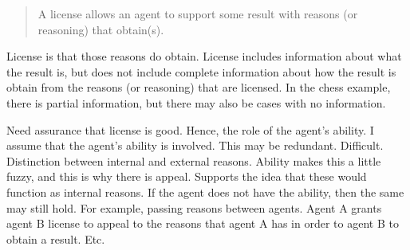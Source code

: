 \documentclass[10pt]{article}
\begin{document}
\begin{note}[License]

  \begin{quote}
    A license allows an agent to support some result with reasons (or reasoning) that obtain(s).
  \end{quote}
  License is that those reasons do obtain.
  License includes information about what the result is, but does not include complete information about how the result is obtain from the reasons (or reasoning) that are licensed.
  In the chess example, there is partial information, but there may also be cases with no information.

  Need assurance that license is good.
  Hence, the role of the agent's ability.
  I assume that the agent's ability is involved.
  This may be redundant.
  Difficult.
  Distinction between internal and external reasons.
  Ability makes this a little fuzzy, and this is why there is appeal.
  Supports the idea that these would function as internal reasons.
  If the agent does not have the ability, then the same may still hold.
  For example, passing reasons between agents.
  Agent A grants agent B license to appeal to the reasons that agent A has in order to agent B to obtain a result.
  Etc.
\end{note}
\end{document}
